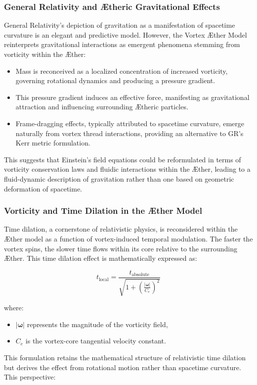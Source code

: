 \subsubsection*{General Relativity and \AE theric Gravitational Effects}
General Relativity's depiction of gravitation as a manifestation of spacetime curvature is an elegant and predictive model.
However, the Vortex \AE ther Model reinterprets gravitational interactions as emergent phenomena stemming from vorticity within the \AE ther:

\begin{itemize}
    \item Mass is reconceived as a localized concentration of increased vorticity, governing rotational dynamics and producing a pressure gradient.
    \item This pressure gradient induces an effective force, manifesting as gravitational attraction and influencing surrounding \AE theric particles.
    \item Frame-dragging effects, typically attributed to spacetime curvature, emerge naturally from vortex thread interactions, providing an alternative to GR’s Kerr metric formulation.
\end{itemize}
This suggests that Einstein's field equations could be reformulated in terms of vorticity conservation laws and fluidic interactions within the \AE ther, leading to a fluid-dynamic description of gravitation rather than one based on geometric deformation of spacetime.

\subsubsection*{Vorticity and Time Dilation in the \AE ther Model}
Time dilation, a cornerstone of relativistic physics, is reconsidered within the \AE ther model as a function of vortex-induced temporal modulation.
The faster the vortex spins, the slower time flows within its core relative to the surrounding \AE ther.
This time dilation effect is mathematically expressed as:

\begin{equation}
    t_{\text{local}} = \frac{t_{\text{absolute}}}{\sqrt{1 + \left( \frac{|\boldsymbol{\omega}|}{C_e} \right)^2 }}\label{eq:TimeDilation}
\end{equation}

where:

\begin{itemize}
    \item $|\boldsymbol{\omega}|$ represents the magnitude of the vorticity field,
    \item $C_e$ is the vortex-core tangential velocity constant.
\end{itemize}
This formulation retains the mathematical structure of relativistic time dilation but derives the effect from rotational motion rather than spacetime curvature.
This perspective:

